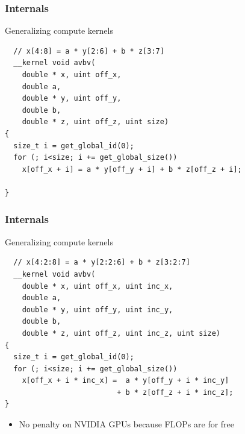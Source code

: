 \begin{frame}[fragile]
\frametitle{Internals}

 \begin{block}{Generalizing compute kernels}
  \begin{lstlisting}
  // x[4:8] = a * y[2:6] + b * z[3:7]
  __kernel void avbv(
    double * x, uint off_x,
    double a,
    double * y, uint off_y,
    double b,
    double * z, uint off_z, uint size)
{
  size_t i = get_global_id(0);
  for (; i<size; i += get_global_size())
    x[off_x + i] = a * y[off_y + i] + b * z[off_z + i]; 

}
  \end{lstlisting}
 \end{block}

 \vspace*{1.57cm}
\end{frame}



\begin{frame}[fragile]
\frametitle{Internals}

 \begin{block}{Generalizing compute kernels}
  \begin{lstlisting}
  // x[4:2:8] = a * y[2:2:6] + b * z[3:2:7]
  __kernel void avbv(
    double * x, uint off_x, uint inc_x,
    double a,
    double * y, uint off_y, uint inc_y,
    double b,
    double * z, uint off_z, uint inc_z, uint size)
{
  size_t i = get_global_id(0);
  for (; i<size; i += get_global_size())
    x[off_x + i * inc_x] =  a * y[off_y + i * inc_y]
                          + b * z[off_z + i * inc_z]; 
}
  \end{lstlisting}
 \end{block}

  \begin{block}{}
   \begin{itemize}
    \item No penalty on NVIDIA GPUs because FLOPs are for free
   \end{itemize}
  \end{block}

\end{frame}


